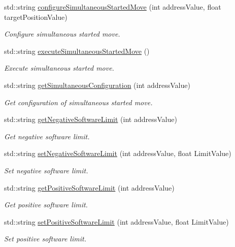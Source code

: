 \begin{DoxyCompactItemize}
std\+::string \hyperlink{namespaceconex_a5fe4df9385c4ac7842eee6c04fa6bda6}{configure\+Simultaneous\+Started\+Move} (int address\+Value, float target\+Position\+Value)
\begin{DoxyCompactList}\small\item\em Configure simultaneous started move. \end{DoxyCompactList}\item 
std\+::string \hyperlink{namespaceconex_a2502bb0dfe401313b2505e560b41c8d5}{execute\+Simultaneous\+Started\+Move} ()
\begin{DoxyCompactList}\small\item\em Execute simultaneous started move. \end{DoxyCompactList}\item 
std\+::string \hyperlink{namespaceconex_a66d5bce36b76f68906f18e8a553b07ea}{get\+Simultaneous\+Configuration} (int address\+Value)
\begin{DoxyCompactList}\small\item\em Get configuration of simultaneous started move. \end{DoxyCompactList}\item 
std\+::string \hyperlink{namespaceconex_a90e63f39f299603adfbab034098ae702}{get\+Negative\+Software\+Limit} (int address\+Value)
\begin{DoxyCompactList}\small\item\em Get negative software limit. \end{DoxyCompactList}\item 
std\+::string \hyperlink{namespaceconex_a70c1cfd0edc011bcf941ed9c4a63efe2}{set\+Negative\+Software\+Limit} (int address\+Value, float Limit\+Value)
\begin{DoxyCompactList}\small\item\em Set negative software limit. \end{DoxyCompactList}\item 
std\+::string \hyperlink{namespaceconex_ac78edbc8a18860189cd3963fb2b543f2}{get\+Positive\+Software\+Limit} (int address\+Value)
\begin{DoxyCompactList}\small\item\em Get positive software limit. \end{DoxyCompactList}\item 
std\+::string \hyperlink{namespaceconex_a786f1251f31ef6a30a042ac4fdbfb815}{set\+Positive\+Software\+Limit} (int address\+Value, float Limit\+Value)
\begin{DoxyCompactList}\small\item\em Set positive software limit. \end{DoxyCompactList}\item 

\end{DoxyCompactItemize}
